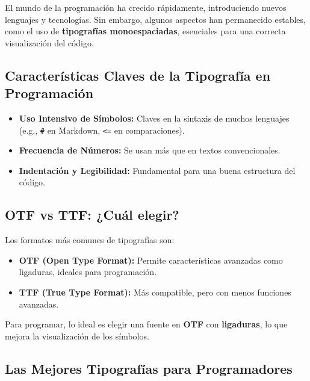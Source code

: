 \documentclass[
  jou,
  floatsintext,
  longtable,
  a4paper,
  nolmodern,
  notxfonts,
  notimes,
  colorlinks=true,linkcolor=blue,citecolor=blue,urlcolor=blue]{apa7}
\providecommand{\tightlist}{%
  \setlength{\itemsep}{0pt}\setlength{\parskip}{0pt}}
\begin{document}
El mundo de la programación ha crecido rápidamente, introduciendo nuevos
lenguajes y tecnologías. Sin embargo, algunos aspectos han permanecido
estables, como el uso de \textbf{tipografías monoespaciadas}, esenciales
para una correcta visualización del código.

\subsection{Características Claves de la Tipografía en
Programación}\label{caracteruxedsticas-claves-de-la-tipografuxeda-en-programaciuxf3n}

\begin{itemize}
\tightlist
\item
  \textbf{Uso Intensivo de Símbolos:} Claves en la sintaxis de muchos
  lenguajes (e.g., \texttt{\#} en Markdown, \texttt{\textless{}=} en
  comparaciones).\\
\item
  \textbf{Frecuencia de Números:} Se usan más que en textos
  convencionales.\\
\item
  \textbf{Indentación y Legibilidad:} Fundamental para una buena
  estructura del código.
\end{itemize}

\subsection{OTF vs TTF: ¿Cuál elegir?}\label{otf-vs-ttf-cuuxe1l-elegir}

Los formatos más comunes de tipografías son:

\begin{itemize}
\tightlist
\item
  \textbf{OTF (Open Type Format):} Permite características avanzadas
  como ligaduras, ideales para programación.\\
\item
  \textbf{TTF (True Type Format):} Más compatible, pero con menos
  funciones avanzadas.
\end{itemize}

Para programar, lo ideal es elegir una fuente en \textbf{OTF} con
\textbf{ligaduras}, lo que mejora la visualización de los símbolos.

\subsection{Las Mejores Tipografías para
Programadores}\label{las-mejores-tipografuxedas-para-programadores}
\end{document}
